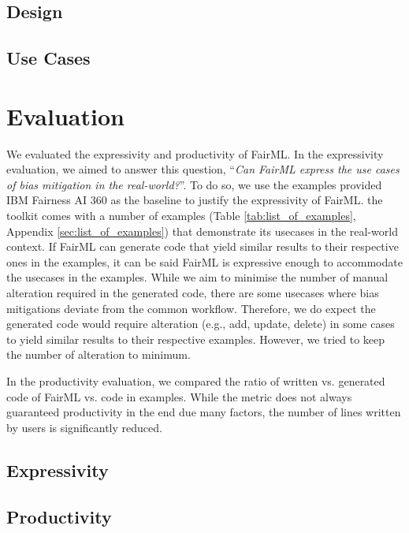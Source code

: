 \documentclass[final,5p,times,twocolumn]{elsarticle}
\begin{document}
\subsection{Design}
\label{sec:design}

\subsection{Use Cases}
\label{sec:use_Cases}

\section{Evaluation}
\label{sec:evaluation}

We evaluated the expressivity and productivity of FairML. 
In the expressivity evaluation, we aimed to answer this question, 
``\textit{Can FairML express the use cases of bias mitigation in the real-world?}''. To do so, we use the examples provided IBM Fairness AI 360 as the baseline to justify the expressivity of FairML. 
the toolkit comes with a number of examples (Table \ref{tab:list_of_examples}, Appendix \ref{sec:list_of_examples}) that demonstrate 
its usecases in the real-world context. If FairML can generate code
that yield similar results to their respective ones in the examples, it can be said FairML is expressive enough to accommodate the usecases in the examples. 
While we aim to minimise the number of manual alteration required in the generated code, there are some usecases where bias mitigations deviate from the common workflow. Therefore, we do expect the generated code would require alteration (e.g., add, update, delete) in some cases to yield similar results to their respective examples. However, we tried to keep the number of alteration to minimum. 

In the productivity evaluation, 
we compared the ratio of written vs. generated code of FairML vs.
code in examples. 
While the metric does not always guaranteed productivity in the end due many factors, 
the number of lines written by users is significantly reduced. 

\subsection{Expressivity}
\label{sec:expressivity}




\subsection{Productivity}
\label{sec:productivity}
\end{document}
